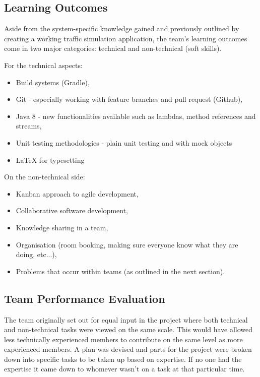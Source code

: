 \subsection{Learning Outcomes}

Aside from the system-specific knowledge gained and previously outlined by creating a working traffic simulation application, the team's learning outcomes come in two major categories: technical and non-technical (soft skills).

For the technical aspects:
\begin{itemize}
	\item Build systems (Gradle),
	\item Git - especially working with feature branches and pull request (Github),
	\item Java 8 - new functionalities available such as lambdas, method references and streams,
	\item Unit testing methodologies - plain unit testing and with mock objects
	\item LaTeX for typesetting
\end{itemize}

On the non-technical side:
\begin{itemize}
	\item Kanban approach to agile development,
	\item Collaborative software development,
	\item Knowledge sharing in a team,
	\item Organisation (room booking, making sure everyone know what they are doing, etc...),
	\item Problems that occur within teams (as outlined in the next section).
\end{itemize}

\subsection{Team Performance Evaluation}

The team originally set out for equal input in the project where both technical and non-technical tasks were viewed on the same scale. This would have allowed less technically experienced members to contribute on the same level as more experienced members. A plan was devised and parts for the project were broken down into specific tasks to be taken up based on expertise. If no one had the expertise it came down to whomever wasn't on a task at that particular time.

